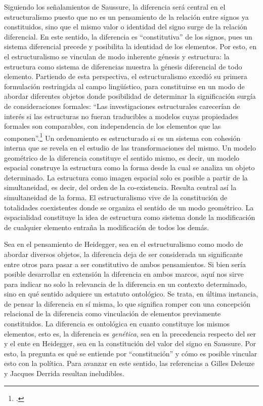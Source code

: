 \documentclass{book}
\begin{document}
Siguiendo los señalamientos de Saussure, la diferencia será central en
el estructuralismo puesto que no es un pensamiento de la relación entre
signos ya constituidos, sino que el mismo valor o identidad del signo
surge de la relación diferencial. En este sentido, la diferencia es
\enquote{constitutiva} de los signos, pues un sistema diferencial precede y
posibilita la identidad de los elementos. Por esto, en el
estructuralismo se vinculan de modo inherente génesis y estructura: la
estructura como sistema de diferencias muestra la génesis diferencial de
todo elemento. Partiendo de esta perspectiva, el estructuralismo excedió
su primera formulación restringida al campo lingüístico, para
constituirse en un modo de abordar diferentes objetos donde posibilidad
de determinar la significación surgía de consideraciones formales: \enquote{Las
investigaciones estructurales carecerían de interés si las estructuras
no fueran traducibles a modelos cuyas propiedades formales son
comparables, con independencia de los elementos que las
componen}.\footcite[256]{levistrauss1977} Un ordenamiento es
estructurado si es un sistema con cohesión interna que se revela en el
estudio de las transformaciones del mismo. Un modelo geométrico de la
diferencia constituye el sentido mismo, es decir, un modelo espacial
construye la estructura como la forma desde la cual se analiza un objeto
determinado. La estructura como imagen espacial solo es posible a partir
de la simultaneidad, es decir, del orden de la co-existencia. Resulta
central así la simultaneidad de la forma. El estructuralismo vive de la
constitución de totalidades coexistentes donde se organiza el sentido de
un modo geométrico. La espacialidad constituye la idea de estructura
como sistema donde la modificación de cualquier elemento entraña la
modificación de todos los demás.

Sea en el pensamiento de Heidegger, sea en el estructuralismo como modo
de abordar diversos objetos, la diferencia deja de ser considerada un
significante entre otros para pasar a ser constitutivo de ambos
pensamientos. Si bien sería posible desarrollar en extensión la
diferencia en ambos marcos, aquí nos sirve para indicar no solo la
relevancia de la diferencia en un contexto determinado, sino en qué
sentido adquiere un estatuto ontológico. Se trata, en última instancia,
de pensar la diferencia en sí misma, lo que significa romper con una
concepción relacional de la diferencia como vinculación de elementos
previamente constituidos. La diferencia es ontológica en cuanto
constituye los mismos elementos, esto es, la diferencia es
\emph{genética}, sea en la precedencia respecto del ser y el ente en
Heidegger, sea en la constitución del valor del signo en Saussure. Por
esto, la pregunta es qué se entiende por \enquote{constitución} y cómo es
posible vincular esto con la política. Para avanzar en este sentido, las
referencias a Gilles Deleuze y Jacques Derrida resultan ineludibles.
\end{document}
